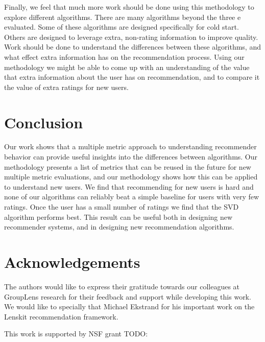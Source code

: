 \documentclass[letterpaper]{sig-alternate}
\begin{document}
  Finally, we feel that much more work should be done using this methodology to explore different algorithms.
  There are many algorithms beyond the three e evaluated.
  Some of these algorithms are designed specifically for cold start.
  Others are designed to leverage extra, non-rating information to improve quality.
  Work should be done to understand the differences between these algorithms, and what effect extra information has on the recommendation process.
  Using our methodology we might be able to come up with an understanding of the value that extra information about the user has on recommendation, and to compare it the value of extra ratings for new users.



\section{Conclusion}

  Our work shows that a multiple metric approach to understanding recommender behavior can provide useful insights into the differences between algorithms.
  Our methodology presents a list of metrics that can be reused in the future for new multiple metric evaluations, and our methodology shows how this can be applied to understand new users.
  We find that recommending for new users is hard and none of our algorithms can reliably beat a simple baseline for users with very few ratings.
  Once the user has a small number of ratings we find that the SVD algorithm performs best.
  This result can be useful both in designing new recommender systems, and in designing new recommendation algorithms.


\section{Acknowledgements}
  
  The authors would like to express their gratitude towards our colleagues at GroupLens research for their feedback and support while developing this work.
  We would like to specially that Michael Ekstrand for his  important work on the Lenskit recommendation framework.

  This work is supported by NSF grant TODO:


\end{document}
